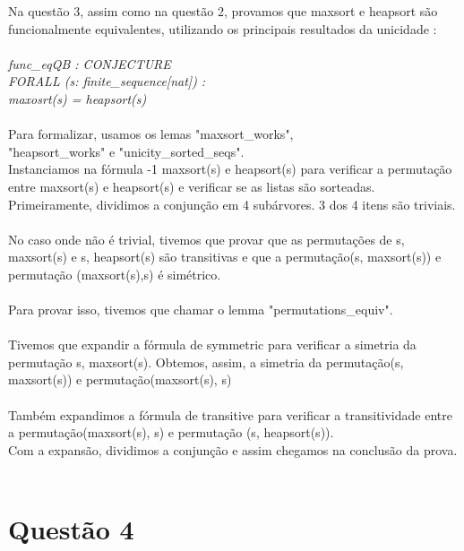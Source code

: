 \documentclass{article}
\begin{document}
Na questão 3, assim como na questão 2, provamos que maxsort e heapsort são funcionalmente equivalentes, utilizando os principais resultados da unicidade :\\
\\
\textit{
	func\_eqQB :  CONJECTURE\\
	FORALL (s: finite_sequence[nat]) :\\
	maxosrt(s) = heapsort(s)\\
}
\\
Para formalizar, usamos os lemas "maxsort\_works",\\
"heapsort\_works" e "unicity\_sorted\_seqs".\\
Instanciamos na fórmula -1 maxsort(s) e heapsort(s) para verificar a permutação \\
entre maxsort(s) e heapsort(s) e verificar se as listas são sorteadas.
\\
Primeiramente, dividimos a conjunção em 4 subárvores. 3 dos 4 itens são triviais. \\
\\
No caso onde não é trivial, tivemos que provar que as permutações de s, maxsort(s) e s, heapsort(s) são transitivas e que a permutação(s, maxsort(s)) e permutação (maxsort(s),s) é simétrico. \\
\\

Para provar isso, tivemos que chamar o lemma "permutations\_equiv".\\
\\

Tivemos que expandir a fórmula de symmetric para verificar a simetria da permutação s, maxsort(s). Obtemos, assim, a simetria da permutação(s, maxsort(s)) e permutação(maxsort(s), s) \\
\\

Também expandimos a fórmula de transitive para verificar a transitividade entre a permutação(maxsort(s), s) e permutação (s, heapsort(s)).\\
Com a expansão, dividimos a conjunção e assim chegamos na conclusão da prova.\\
\\





\section{Questão 4}
\end{document}
